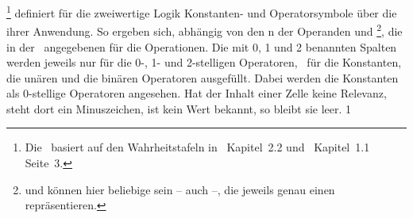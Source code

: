 %
\footnote{%
	Die \tablename\ basiert auf den Wahrheitstafeln in~\cite{bib:Junktor} Kapitel~2.2 und~\cite{bib:Rautenberg} Kapitel~1.1 Seite~3.%
}
definiert für die zweiwertige Logik Konstanten- und Operatorsymbole über die  ihrer Anwendung.
So ergeben sich, abhängig von den n der Operanden  und %
\footnote{%
	 und  können hier beliebige  sein -- auch  --, die jeweils genau einen  repräsentieren.%
},
die in der \tablename\ angegebenen  für die Operationen.
Die mit 0, 1 und 2 benannten Spalten werden jeweils nur für die 0-, 1- und 2-stelligen Operatoren, \textdh\ für die Konstanten, die unären und die binären Operatoren ausgefüllt.
Dabei werden die Konstanten als 0-stellige Operatoren angesehen.
Hat der Inhalt einer Zelle keine Relevanz, steht dort ein Minuszeichen, ist kein Wert bekannt, so bleibt sie leer.
%
    \setcounter{prio}    {1}
    \setcounter{pnot}    {\value{prio}}
    \setcounter{pand}    {\value{prio}}
   \setcounter{pnand}   {\value{prio}}
   \setcounter{pmult}   {\value{prio}}
     \setcounter{por}     {\value{prio}}
    \setcounter{pnor}    {\value{prio}}
    \setcounter{pxor}    {\value{prio}}
    \setcounter{padd}    {\value{prio}}
    \setcounter{pimp}    {\value{prio}}
   \setcounter{pnimp}   {\value{prio}}
    \setcounter{prep}    {\value{prio}}
   \setcounter{pnrep}   {\value{prio}}
  \setcounter{pequiv}  {\value{prio}}
 \setcounter{pnequiv} {\value{prio}}

